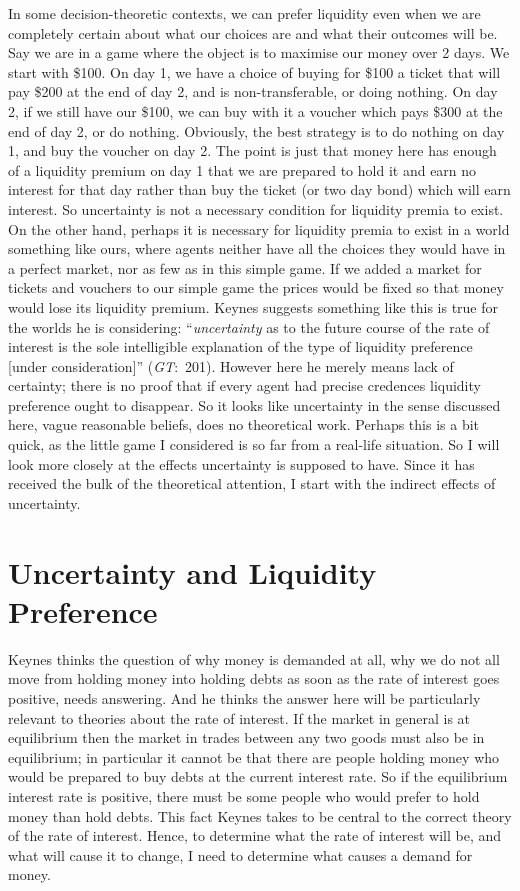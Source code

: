 In some decision-theoretic contexts, we can prefer liquidity even when we are completely certain about what our choices are and what their outcomes will be. Say we are in a game where the object is to maximise our money over 2 days. We start with \$100. On day 1, we have a choice of buying for \$100 a ticket that will pay \$200 at the end of day 2, and is non-transferable, or doing nothing. On day 2, if we still have our \$100, we can buy with it a voucher which pays \$300 at the end of day 2, or do nothing. Obviously, the best strategy is to do nothing on day 1, and buy the voucher on day 2. The point is just that money here has enough of a liquidity premium on day 1 that we are prepared to hold it and earn no interest for that day rather than buy the ticket (or two day bond) which will earn interest. So uncertainty is not a necessary condition for liquidity premia to exist. On the other hand, perhaps it is necessary for liquidity premia to exist in a world something like ours, where agents neither have all the choices they would have in a perfect market, nor as few as in this simple game. If we added a market for tickets and vouchers to our simple game the prices would be fixed so that money would lose its liquidity premium. Keynes suggests something like this is true for the worlds he is considering: ``\textit{uncertainty} as to the future course of the rate of interest is the sole intelligible explanation of the type of liquidity preference [under consideration]'' (\textit{GT}:~201). However here he merely means lack of certainty; there is no proof that if every agent had precise credences liquidity preference ought to disappear. So it looks like uncertainty in the sense discussed here, vague reasonable beliefs, does no theoretical work. Perhaps this is a bit quick, as the little game I considered is so far from a real-life situation. So I will look more closely at the effects uncertainty is supposed to have. Since it has received the bulk of the theoretical attention, I start with the indirect effects of uncertainty.

\section{Uncertainty and Liquidity Preference}
Keynes thinks the question of why money is demanded at all, why we do not all move from holding money into holding debts as soon as the rate of interest goes positive, needs answering. And he thinks the answer here will be particularly relevant to theories about the rate of interest. If the market in general is at equilibrium then the market in trades between any two goods must also be in equilibrium; in particular it cannot be that there are people holding money who would be prepared to buy debts at the current interest rate. So if the equilibrium interest rate is positive, there must be some people who would prefer to hold money than hold debts. This fact Keynes takes to be central to the correct theory of the rate of interest. Hence, to determine what the rate of interest will be, and what will cause it to change, I need to determine what causes a demand for money.

